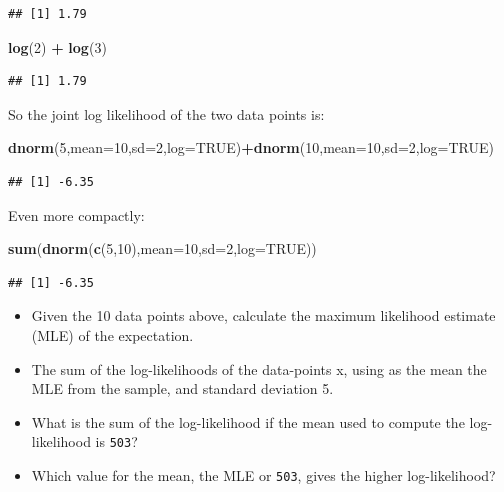 \documentclass[12pt,]{krantz}
\newenvironment{Shaded}{\begin{snugshade}}{\end{snugshade}}
\newcommand{\DataTypeTok}[1]{\textcolor[rgb]{0.13,0.29,0.53}{#1}}
\newcommand{\DecValTok}[1]{\textcolor[rgb]{0.00,0.00,0.81}{#1}}
\newcommand{\KeywordTok}[1]{\textcolor[rgb]{0.13,0.29,0.53}{\textbf{#1}}}
\newcommand{\NormalTok}[1]{#1}
\newcommand{\OperatorTok}[1]{\textcolor[rgb]{0.81,0.36,0.00}{\textbf{#1}}}
\newcommand{\OtherTok}[1]{\textcolor[rgb]{0.56,0.35,0.01}{#1}}
\newcommand{\StringTok}[1]{\textcolor[rgb]{0.31,0.60,0.02}{#1}}
\providecommand{\tightlist}{%
  \setlength{\itemsep}{0pt}\setlength{\parskip}{0pt}}
\theoremstyle{definition}
\theoremstyle{definition}
\theoremstyle{definition}
\theoremstyle{remark}
\begin{document}
\begin{verbatim}
## [1] 1.79
\end{verbatim}

\begin{Shaded}
\begin{Highlighting}[]
\KeywordTok{log}\NormalTok{(}\DecValTok{2}\NormalTok{) }\OperatorTok{+}\StringTok{ }\KeywordTok{log}\NormalTok{(}\DecValTok{3}\NormalTok{)}
\end{Highlighting}
\end{Shaded}

\begin{verbatim}
## [1] 1.79
\end{verbatim}

So the joint log likelihood of the two data points is:

\begin{Shaded}
\begin{Highlighting}[]
\KeywordTok{dnorm}\NormalTok{(}\DecValTok{5}\NormalTok{,}\DataTypeTok{mean=}\DecValTok{10}\NormalTok{,}\DataTypeTok{sd=}\DecValTok{2}\NormalTok{,}\DataTypeTok{log=}\OtherTok{TRUE}\NormalTok{)}\OperatorTok{+}\KeywordTok{dnorm}\NormalTok{(}\DecValTok{10}\NormalTok{,}\DataTypeTok{mean=}\DecValTok{10}\NormalTok{,}\DataTypeTok{sd=}\DecValTok{2}\NormalTok{,}\DataTypeTok{log=}\OtherTok{TRUE}\NormalTok{)}
\end{Highlighting}
\end{Shaded}

\begin{verbatim}
## [1] -6.35
\end{verbatim}

Even more compactly:

\begin{Shaded}
\begin{Highlighting}[]
\KeywordTok{sum}\NormalTok{(}\KeywordTok{dnorm}\NormalTok{(}\KeywordTok{c}\NormalTok{(}\DecValTok{5}\NormalTok{,}\DecValTok{10}\NormalTok{),}\DataTypeTok{mean=}\DecValTok{10}\NormalTok{,}\DataTypeTok{sd=}\DecValTok{2}\NormalTok{,}\DataTypeTok{log=}\OtherTok{TRUE}\NormalTok{))}
\end{Highlighting}
\end{Shaded}

\begin{verbatim}
## [1] -6.35
\end{verbatim}

\begin{itemize}
\tightlist
\item
  Given the 10 data points above, calculate the maximum likelihood estimate (MLE) of the expectation.
\item
  The sum of the log-likelihoods of the data-points x, using as the mean the MLE from the sample, and standard deviation 5.
\item
  What is the sum of the log-likelihood if the mean used to compute the log-likelihood is \texttt{503}?
\item
  Which value for the mean, the MLE or \texttt{503}, gives the higher log-likelihood?
\end{itemize}
\end{document}
